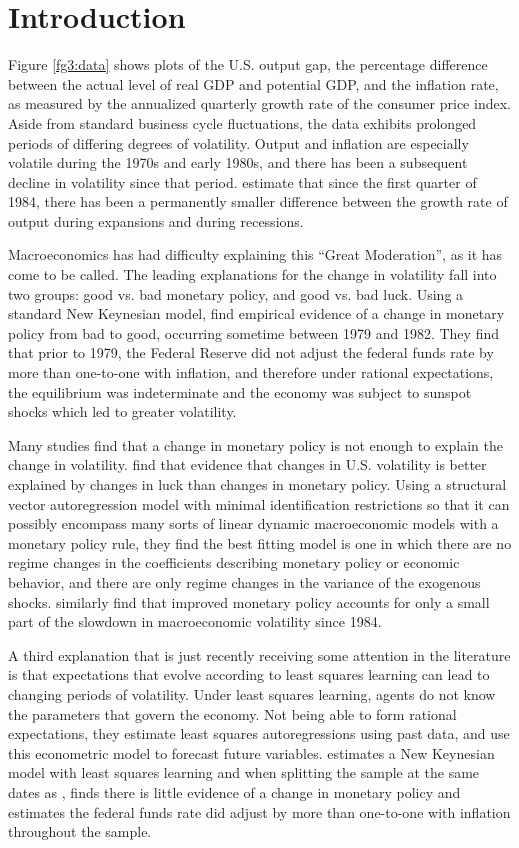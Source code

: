 
\section{Introduction}
Figure \ref{fg3:data} shows plots of the U.S. output gap, the percentage difference between the actual level of real GDP and potential GDP, and the inflation rate, as measured by the annualized quarterly growth rate of the consumer price index.  Aside from standard business cycle fluctuations, the data exhibits prolonged periods of differing degrees of volatility.  Output and inflation are especially volatile during the 1970s and early 1980s, and there has been a subsequent decline in volatility since that period.   estimate that since the first quarter of 1984, there has been a permanently smaller difference between the growth rate of output during expansions and during recessions.

Macroeconomics has had difficulty explaining this ``Great Moderation'', as it has come to be called.  The leading explanations for the change in volatility fall into two groups: good vs. bad monetary policy, and good vs. bad luck.  Using a standard New Keynesian model,  find empirical evidence of a change in monetary policy from bad to good, occurring sometime between 1979 and 1982.  They find that prior to 1979, the Federal Reserve did not adjust the federal funds rate by more than one-to-one with inflation, and therefore under rational expectations, the equilibrium was indeterminate and the economy was subject to sunspot shocks which led to greater volatility.  

Many studies find that a change in monetary policy is not enough to explain the change in volatility.  find that evidence that changes in U.S. volatility is better explained by changes in luck than changes in monetary policy.  Using a structural vector autoregression model with minimal identification restrictions so that it can possibly encompass many sorts of linear dynamic macroeconomic models with a monetary policy rule, they find the best fitting model is one in which there are no regime changes in the coefficients describing monetary policy or economic behavior, and there are only regime changes in the variance of the exogenous shocks.   similarly find that improved monetary policy accounts for only a small part of the slowdown in macroeconomic volatility since 1984.

A third explanation that is just recently receiving some attention in the literature is that expectations that evolve according to least squares learning can lead to changing periods of volatility.  Under least squares learning, agents do not know the parameters that govern the economy.  Not being able to form rational expectations, they estimate least squares autoregressions using past data, and use this econometric model to forecast future variables.   estimates a New Keynesian model with least squares learning and when splitting the sample at the same dates as , finds there is little evidence of a change in monetary policy and estimates the federal funds rate did adjust by more than one-to-one with inflation throughout the sample.  


